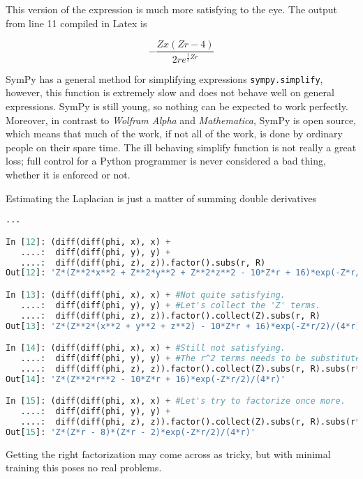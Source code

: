 This version of the expression is much more satisfying to the eye. The output from line 11 compiled in Latex is

\begin{equation*}
 - \frac{Z x \left(Z r -4\right)}{2 r e^{\frac{1}{2} Z r}}
\end{equation*}

SymPy has a general method for simplifying expressions \verb+sympy.simplify+, however, this function is extremely slow and does not behave well on general expressions. SymPy is still young, so nothing can be expected to work perfectly. Moreover, in contrast to \textit{Wolfram Alpha} and \textit{Mathematica}, SymPy is open source, which means that much of the work, if not all of the work, is done by ordinary people on their spare time. The ill behaving simplify function is not really a great loss; full control for a Python programmer is never considered a bad thing, whether it is enforced or not.

\clearpage
Estimating the Laplacian is just a matter of summing double derivatives

\vspace{0.25cm}
\begin{lstlisting}[language=Python]
...

In [12]: (diff(diff(phi, x), x) + 
   ....:  diff(diff(phi, y), y) + 
   ....:  diff(diff(phi, z), z)).factor().subs(r, R)
Out[12]: 'Z*(Z**2*x**2 + Z**2*y**2 + Z**2*z**2 - 10*Z*r + 16)*exp(-Z*r/2)/(4*r)'

In [13]: (diff(diff(phi, x), x) + #Not quite satisfying.
   ....:  diff(diff(phi, y), y) + #Let's collect the 'Z' terms.
   ....:  diff(diff(phi, z), z)).factor().collect(Z).subs(r, R)
Out[13]: 'Z*(Z**2*(x**2 + y**2 + z**2) - 10*Z*r + 16)*exp(-Z*r/2)/(4*r)'

In [14]: (diff(diff(phi, x), x) + #Still not satisfying.
   ....:  diff(diff(phi, y), y) + #The r^2 terms needs to be substituted as well.
   ....:  diff(diff(phi, z), z)).factor().collect(Z).subs(r, R).subs(r**2, R**2)
Out[14]: 'Z*(Z**2*r**2 - 10*Z*r + 16)*exp(-Z*r/2)/(4*r)'

In [15]: (diff(diff(phi, x), x) + #Let's try to factorize once more.
   ....:  diff(diff(phi, y), y) + 
   ....:  diff(diff(phi, z), z)).factor().collect(Z).subs(r, R).subs(r**2, R**2).factor()
Out[15]: 'Z*(Z*r - 8)*(Z*r - 2)*exp(-Z*r/2)/(4*r)'

\end{lstlisting}

Getting the right factorization may come across as tricky, but with minimal training this poses no real problems.

